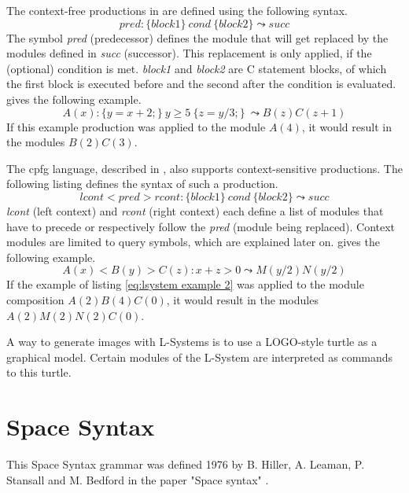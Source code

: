 \documentclass[11pt, a4paper]{report}
\begin{document}
The context-free productions in \citep{PrusinkiewiczEtAl:2001} are defined using the following syntax.
\begin{equation} \label{eq:lsystem context free}
    pred : \{block1\}\ cond\ \{block2\} \leadsto succ
\end{equation}
The symbol \textit{pred} (predecessor) defines the module that will get replaced by the modules defined in \textit{succ} (successor). This replacement is only applied, if the (optional) condition is met. \textit{block1} and \textit{block2} are C statement blocks, of which the first block is executed before and the second after the condition is evaluated. \citep{PrusinkiewiczEtAl:2001} gives the following example.
\begin{equation} \label{eq:lsystem example 1}
    A(x) : \{y = x + 2;\}\ y \geq 5\ \{z = y / 3;\}\ \leadsto B(z)C(z + 1)
\end{equation}
If this example production was applied to the module $A(4)$, it would result in the modules $B(2)C(3)$.

The cpfg language, described in \citep{PrusinkiewiczEtAl:2001}, also supports context-sensitive productions. The following listing defines the syntax of such a production.
\begin{equation} \label{eq:lsystem context sensitive}
    lcont < pred > rcont : \{block1\}\ cond\ \{block2\} \leadsto succ
\end{equation}
\textit{lcont} (left context) and \textit{rcont} (right context) each define a list of modules that have to precede or respectively follow the \textit{pred} (module being replaced). Context modules are limited to query symbols, which are explained later on. \citep{PrusinkiewiczEtAl:2001} gives the following example.
\begin{equation} \label{eq:lsystem example 2}
    A(x) < B(y) > C(z) : x + z > 0 \leadsto M(y / 2)N(y / 2)
\end{equation}
If the example of listing \ref{eq:lsystem example 2} was applied to the module composition $A(2)B(4)C(0)$, it would result in the modules $A(2)M(2)N(2)C(0)$.

A way to generate images with L-Systems is to use a LOGO-style turtle as a graphical model. Certain modules of the L-System are interpreted as commands to this turtle.

\pagebreak
\section{Space Syntax}
This Space Syntax grammar was defined 1976 by B. Hiller, A. Leaman, P. Stansall and M. Bedford in the paper "Space syntax" \citep{shapeGrammars:1972}.
\end{document}
